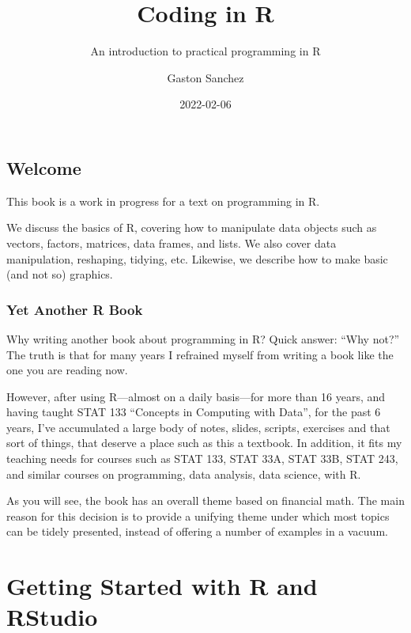 \documentclass[
]{book}
\title{Coding in R}
\subtitle{An introduction to practical programming in R}
\author{Gaston Sanchez}
\date{2022-02-06}
\begin{document}
\maketitle

{
\setcounter{tocdepth}{1}
\tableofcontents
}
\hypertarget{welcome}{%
\chapter*{Welcome}\label{welcome}}

This book is a work in progress for a text on programming in R.

We discuss the basics of R, covering how to manipulate data objects such as
vectors, factors, matrices, data frames, and lists. We also cover data
manipulation, reshaping, tidying, etc. Likewise, we describe how to make
basic (and not so) graphics.

\hypertarget{yet-another-r-book}{%
\section*{Yet Another R Book}\label{yet-another-r-book}}

Why writing another book about programming in R? Quick answer: ``Why not?''
The truth is that for many years I refrained myself from writing a book like
the one you are reading now.

However, after using R---almost on a daily basis---for more than 16 years, and
having taught STAT 133 ``Concepts in Computing with Data'', for the past 6 years,
I've accumulated a large body of notes, slides, scripts, exercises and that
sort of things, that deserve a place such as this a textbook. In addition, it
fits my teaching needs for courses such as STAT 133, STAT 33A, STAT 33B,
STAT 243, and similar courses on programming, data analysis, data science, with R.

As you will see, the book has an overall theme based on financial math. The main
reason for this decision is to provide a unifying theme under which most topics
can be tidely presented, instead of offering a number of examples in a vacuum.

\hypertarget{part-getting-started-with-r-and-rstudio}{%
\part{Getting Started with R and RStudio}\label{part-getting-started-with-r-and-rstudio}}
\end{document}
